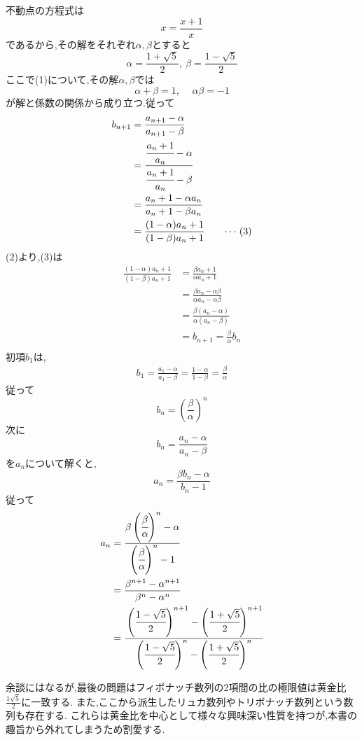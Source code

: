 \begin{enumerate}[label=(\arabic*),parsep=3pt]
            不動点の方程式は
            \[
              x=\frac{x+1}{x}\tag*{\(\cdots\) (1)}
            \]
            であるから,その解をそれぞれ$\alpha,\beta$とすると
            \[
              \alpha=\frac{1+\sqrt{5}}{2},\ \beta=\frac{1-\sqrt{5}}{2}
            \]
            ここで(1)について,その解$\alpha,\beta$では
            \[
              \alpha+\beta=1,\, \quad \alpha\beta=-1\tag*{\(\cdots\) (2)}
            \]
            が解と係数の関係から成り立つ.従って
            \begin{align*}
              b_{n+1}&=\frac{a_{n+1}-\alpha}{a_{n+1}-\beta}\\
              &=\cfrac{\cfrac{a_n+1}{a_n}-\alpha}{\cfrac{a_n+1}{a_n}-\beta}\\
              &=\frac{a_n+1-\alpha a_n}{a_n+1-\beta a_n}\\
              &=\frac{(1-\alpha)a_n+1}{(1-\beta)a_n+1}\tag*{\(\cdots\) (3)}
            \end{align*}
            (2)より,(3)は
            \begin{align*}
              \frac{(1-\alpha)a_n+1}{(1-\beta)a_n+1}&=\frac{\beta a_n+1}{\alpha a_n+1}\\
              &=\frac{\beta a_n-\alpha\beta}{\alpha a_n-\alpha\beta}\\
              &=\frac{\beta (a_n-\alpha)}{\alpha (a_n-\beta)}\\
              &=b_{n+1}=\frac{\beta}{\alpha}b_n\\
            \end{align*}
            初項$b_1$は,
            \begin{align*}
              b_1=\frac{a_1-\alpha}{a_1-\beta}=\frac{1-\alpha}{1-\beta}=\frac{\beta}{\alpha}
            \end{align*}
            従って
            \[
              b_n=\left(\frac{\beta}{\alpha}\right)^n
            \]
            次に
            \[
              b_{n}=\frac{a_{n}-\alpha}{a_{n}-\beta}
            \]
            を$a_n$について解くと,
            \[
              a_{n}=\frac{\beta b_{n}-\alpha}{b_{n}-1}
            \]
            従って
            \begin{align*}
              a_{n}&=\cfrac{\beta \left(\cfrac{\beta}{\alpha}\right)^n-\alpha}{\left(\cfrac{\beta}{\alpha}\right)^n-1}  \\
              &=\frac{\beta^{n+1}-\alpha^{n+1}}{\beta^n-\alpha^n}\\
              &=\cfrac{\left(\cfrac{1-\sqrt{5}}{2}\right)^{n+1}-\left(\cfrac{1+\sqrt{5}}{2}\right)^{n+1}}{\left(\cfrac{1-\sqrt{5}}{2}\right)^n-\left(\cfrac{1+\sqrt{5}}{2}\right)^n}
            \end{align*}        
    \end{enumerate}
  余談にはなるが,最後の問題はフィボナッチ数列の2項間の比の極限値は黄金比$\frac{1\sqrt{5}}{2}$に一致する.
  また,ここから派生したリュカ数列やトリボナッチ数列という数列も存在する.
  これらは黄金比を中心として様々な興味深い性質を持つが,本書の趣旨から外れてしまうため割愛する.

